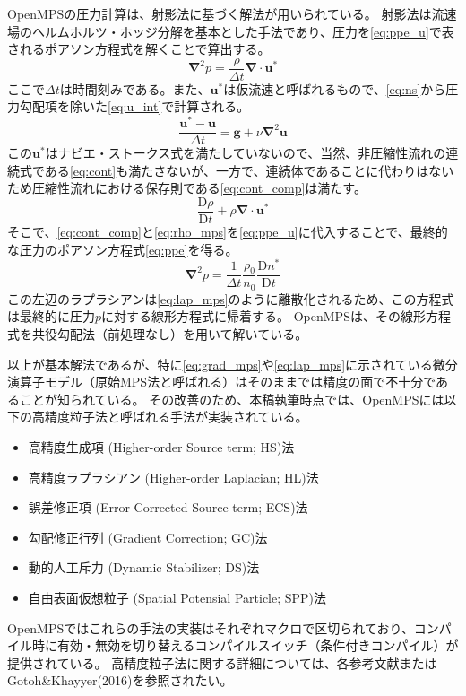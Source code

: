 		OpenMPSの圧力計算は、射影法に基づく解法が用いられている。
		射影法は流速場のヘルムホルツ・ホッジ分解を基本とした手法であり、圧力を\cref{eq:ppe_u}で表されるポアソン方程式を解くことで算出する。
		\begin{equation}
			\mathbf{\nabla}^2 p = \frac{\rho}{\Delta t} \mathbf{\nabla} \cdot \mathbf{u}^* \label{eq:ppe_u}
		\end{equation}
		ここで$\Delta t$は時間刻みである。また、$\mathbf{u}^*$は仮流速と呼ばれるもので、\cref{eq:ns}から圧力勾配項を除いた\cref{eq:u_int}で計算される。
		\begin{equation}
			\frac{\mathbf{u}^* - \mathbf{u}}{\Delta t} = \mathbf{g} + \nu \mathbf{\nabla}^2 \mathbf{u} \label{eq:u_int}
		\end{equation}
		この$\mathbf{u}^*$はナビエ・ストークス式を満たしていないので、当然、非圧縮性流れの連続式である\cref{eq:cont}も満たさないが、一方で、連続体であることに代わりはないため圧縮性流れにおける保存則である\cref{eq:cont_comp}は満たす。
		\begin{equation}
			\frac{\mathrm{D} \rho}{\mathrm{D} t} + \rho \mathbf{\nabla} \cdot \mathbf{u}^* \label{eq:cont_comp}
		\end{equation}
		そこで、\cref{eq:cont_comp}と\cref{eq:rho_mps}を\cref{eq:ppe_u}に代入することで、最終的な圧力のポアソン方程式\cref{eq:ppe}を得る。
		\begin{equation}
			\mathbf{\nabla}^2 p = \frac{1}{\Delta t} \frac{\rho_0}{n_0} \frac{\mathrm{D} n^*}{\mathrm{D} t} \label{eq:ppe}
		\end{equation}
		この左辺のラプラシアンは\cref{eq:lap_mps}のように離散化されるため、この方程式は最終的に圧力$p$に対する線形方程式に帰着する。
		OpenMPSは、その線形方程式を共役勾配法（前処理なし）を用いて解いている。

		以上が基本解法であるが、特に\cref{eq:grad_mps}や\cref{eq:lap_mps}に示されている微分演算子モデル（原始MPS法と呼ばれる）はそのままでは精度の面で不十分であることが知られている。
		その改善のため、本稿執筆時点では、OpenMPSには以下の高精度粒子法と呼ばれる手法が実装されている。
		\begin{itemize}
			\item 高精度生成項 (Higher-order Source term; HS)法 \Cite{ref:Khayyer2009}
			\item 高精度ラプラシアン (Higher-order Laplacian; HL)法 \Cite{ref:Khayyer2010}
			\item 誤差修正項 (Error Corrected Source term; ECS)法 \Cite{ref:Khayyer2011}
			\item 勾配修正行列 (Gradient Correction; GC)法 \Cite{ref:Khayyer2011}
			\item 動的人工斥力 (Dynamic Stabilizer; DS)法 \Cite{ref:Tsuruta2013}
			\item 自由表面仮想粒子 (Spatial Potensial Particle; SPP)法 \Cite{ref:Tsuruta2015}
		\end{itemize}
		OpenMPSではこれらの手法の実装はそれぞれマクロで区切られており、コンパイル時に有効・無効を切り替えるコンパイルスイッチ（条件付きコンパイル）が提供されている。
		高精度粒子法に関する詳細については、各参考文献またはGotoh\&Khayyer(2016)\Cite{ref:gotoh2016}を参照されたい。


